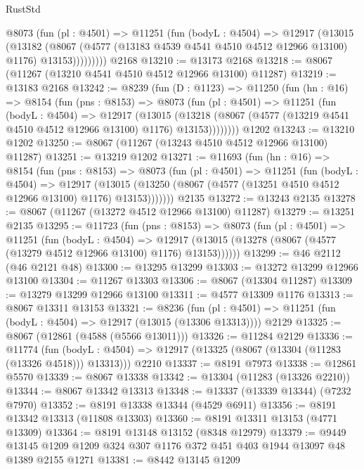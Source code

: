 \begin{lexlean}{RustStd}
\begin{coremodule}
          @8073
            (fun (pl : @4501) =>
            @11251
              (fun (bodyL : @4504) =>
              @12917
                (@13015
                  (@13182
                    (@8067
                      (@4577 (@13183 @4539 @4541 @4510 @4512 @12966 @13100) @1176)
                      @13153)))))))))
    @2168
@13210 := @13173 @2168
@13218 := @8067 (@11267 (@13210 @4541 @4510 @4512 @12966 @13100) @11287)
@13219 := @13183 @2168
@13242 := @8239
    (fun (D : @1123) =>
    @11250
      (fun (hn : @16) =>
      @8154
        (fun (pns : @8153) =>
        @8073
          (fun (pl : @4501) =>
          @11251
            (fun (bodyL : @4504) =>
            @12917
              (@13015
                (@13218 (@8067 (@4577 (@13219 @4541 @4510 @4512 @12966 @13100) @1176) @13153))))))))
    @1202
@13243 := @13210 @1202
@13250 := @8067 (@11267 (@13243 @4510 @4512 @12966 @13100) @11287)
@13251 := @13219 @1202
@13271 := @11693
    (fun (hn : @16) =>
    @8154
      (fun (pns : @8153) =>
      @8073
        (fun (pl : @4501) =>
        @11251
          (fun (bodyL : @4504) =>
          @12917
            (@13015 (@13250 (@8067 (@4577 (@13251 @4510 @4512 @12966 @13100) @1176) @13153)))))))
    @2135
@13272 := @13243 @2135
@13278 := @8067 (@11267 (@13272 @4512 @12966 @13100) @11287)
@13279 := @13251 @2135
@13295 := @11723
    (fun (pns : @8153) =>
    @8073
      (fun (pl : @4501) =>
      @11251
        (fun (bodyL : @4504) =>
        @12917 (@13015 (@13278 (@8067 (@4577 (@13279 @4512 @12966 @13100) @1176) @13153))))))
@13299 := @46 @2112 (@46 @2121 @48)
@13300 := @13295 @13299
@13303 := @13272 @13299 @12966 @13100
@13304 := @11267 @13303
@13306 := @8067 (@13304 @11287)
@13309 := @13279 @13299 @12966 @13100
@13311 := @4577 @13309 @1176
@13313 := @8067 @13311 @13153
@13321 := @8236
    (fun (pl : @4501) => @11251 (fun (bodyL : @4504) => @12917 (@13015 (@13306 @13313))))
    @2129
@13325 := @8067 (@12861 (@4588 (@5566 @13011)))
@13326 := @11284 @2129
@13336 := @11774
    (fun (bodyL : @4504) => @12917 (@13325 (@8067 (@13304 (@11283 (@13326 @4518))) @13313)))
    @2210
@13337 := @8191 @7973
@13338 := @12861 @5570
@13339 := @8067 @13338
@13342 := @13304 (@11283 (@13326 @2210))
@13344 := @8067 @13342 @13313
@13348 := @13337 (@13339 @13344) (@7232 @7970)
@13352 := @8191 @13338 @13344 (@4529 @6911)
@13356 := @8191 @13342 @13313 (@11808 @13303)
@13360 := @8191 @13311 @13153 (@4771 @13309)
@13364 := @8191 @13148 @13152 (@8348 @12979)
@13379 := @9449 @13145 @1209 @1209 @324 @307 @1176 @372 @451 @403 @1944 @13097 @48 @1389 @2155 @1271
@13381 := @8442 @13145 @1209

\end{coremodule}
\end{lexlean}
